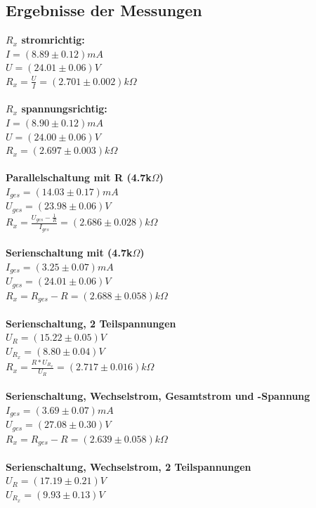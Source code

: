 \documentclass[12pt,a4paper]{article}
\begin{document}
\begin{multicols}{2}
\subsection{Ergebnisse der Messungen}
\textbf{$R_{x}$ stromrichtig:}\\
$I = (8.89 \pm 0.12) mA$\\
$U = (24.01 \pm 0.06) V$ \\
$R_{x} = \frac{U}{I} = (2.701 \pm 0.002) k\Omega$\\
\\
\textbf{$R_{x}$ spannungsrichtig:}\\
$I = (8.90 \pm 0.12) mA$\\
$U = (24.00 \pm 0.06) V$ \\
$R_{x} = (2.697 \pm 0.003) k\Omega$\\
\\
\textbf{Parallelschaltung mit R (4.7k$\Omega$)}\\
$I_{ges} = (14.03 \pm 0.17) mA$\\
$U_{ges} = (23.98 \pm 0.06) V$\\
$R_{x} = \frac{U_{ges} - \frac{1}{R} }{ I_{ges} } = (2.686 \pm 0.028) k\Omega$ \\
\\
\textbf{Serienschaltung mit (4.7k$\Omega$)}\\
$I_{ges} = (3.25 \pm 0.07) mA$\\
$U_{ges} = (24.01 \pm 0.06) V$\\
$R_{x} = R_{ges} - R = (2.688 \pm 0.058) k\Omega$\\
\\
\textbf{Serienschaltung, 2 Teilspannungen}\\
$U_{R} = (15.22 \pm 0.05) V$\\
$U_{R_{x}} = (8.80 \pm 0.04) V$\\
$R_{x} = \frac{R*U_{R_{x}}}{U_{R}} = (2.717 \pm 0.016) k\Omega$\\
\\
\textbf{Serienschaltung, Wechselstrom, Gesamtstrom und -Spannung}\\
$I_{ges} = (3.69 \pm 0.07) mA$\\
$U_{ges} = (27.08 \pm 0.30) V$\\
$R_{x} = R_{ges} - R = (2.639 \pm 0.058) k\Omega$\\
\\
\textbf{Serienschaltung, Wechselstrom, 2 Teilspannungen}\\
$U_{R} = (17.19 \pm 0.21) V$\\
$U_{R_{x}} = (9.93 \pm 0.13) V$\\

\end{multicols}
\end{document}
